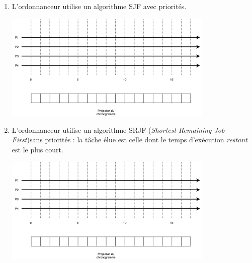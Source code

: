 \documentclass[a4paper,12pt,french]{article}
\begin{document}
\begin{enumerate}
    \item L'ordonnanceur utilise un algorithme SJF avec priorités.
            \begin{center}
            \includegraphics[width=10cm]{img/mc}\\
            \end{center}
        
     \item L'ordonnanceur utilise un algorithme SRJF (\textit{Shortest Remaining Job First})sans priorités : la tâche élue est celle dont le temps d'exécution \textit{restant} est le plus court.
                 \begin{center}
                 \includegraphics[width=10cm]{img/mc}\\
                 \end{center}
\end{enumerate}
\exo{}\\
\end{document}
